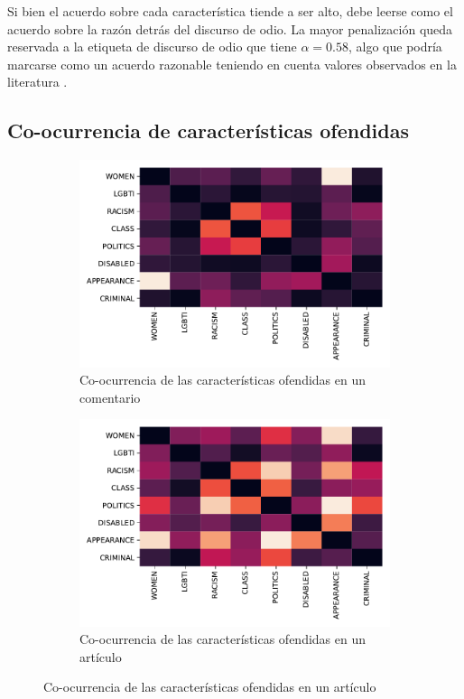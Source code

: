 Si bien el acuerdo sobre cada característica tiende a ser alto, debe leerse como el acuerdo sobre la razón detrás del discurso de odio. La mayor penalización queda reservada a la etiqueta de discurso de odio que tiene $\alpha = 0.58$, algo que podría marcarse como un acuerdo razonable teniendo en cuenta valores observados en la literatura \cite{poletto2021resources}.



\subsection{Co-ocurrencia de características ofendidas}

\begin{figure}[t]
    \centering
    \begin{subfigure}[]{0.49\textwidth}
        \includegraphics[width=\textwidth]{img/05/heatmap_characteristics.pdf}
        \caption{Co-ocurrencia de las características ofendidas en un comentario}
        \label{subfig:heatmap_characteristics_comment}
    \end{subfigure}
    \begin{subfigure}[]{0.49\textwidth}
        \centering
        \includegraphics[width=\textwidth]{img/05/heatmap_characteristics_article.pdf}
        \caption{Co-ocurrencia de las características ofendidas en un artículo}
        \label{subfig:heatmap_characteristics_article}
    \end{subfigure}


\end{figure}
